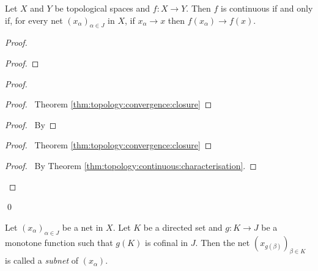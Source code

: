   \begin{thm}
    \label{thm:topology:convergence:continuous}
 Let $X$ and $Y$ be topological spaces and $f : X \rightarrow Y$. Then $f$ is
 continuous if and only if, for every net $(x_\alpha)_{\alpha \in J}$ in $X$,
if $x_\alpha \rightarrow x$ then $f(x_\alpha) \rightarrow f(x)$.
\end{thm}

\begin{proof}
 \pf
 \begin{proof}
 \end{proof}
 \begin{proof}
   \begin{proof}
     \pf\ Theorem \ref{thm:topology:convergence:closure}
   \end{proof}
   \begin{proof}
     \pf\ By 
   \end{proof}
   \begin{proof}
     \pf\ Theorem \ref{thm:topology:convergence:closure}
   \end{proof}
   \qedstep
   \begin{proof}
     \pf\ By Theorem \ref{thm:topology:continuous:characterisation}.
   \end{proof}
 \end{proof}
 \qed
\end{proof}

  \begin{df}[Subnet]
  Let $(x_\alpha)_{\alpha \in J}$ be a net in $X$. Let $K$ be a directed set
and $g : K \rightarrow J$ be a monotone function such that $g(K)$ is cofinal in
$J$. Then the net $(x_{g(\beta)})_{\beta \in K}$ is called a \emph{subnet} of
$(x_\alpha)$.
\end{df}

